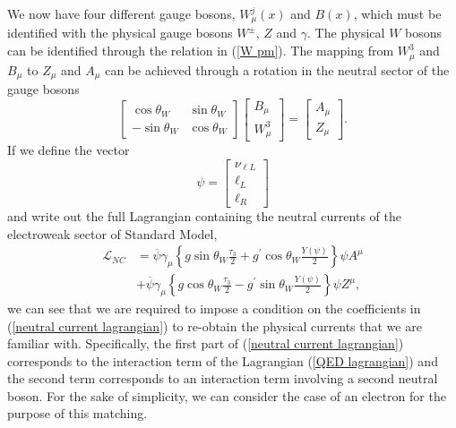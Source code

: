 \documentclass[10pt,a4paper]{book}
\begin{document}
We now have four different gauge bosons, $W^j_\mu(x)$ and $B(x)$, which must be identified with the physical gauge bosons $W^\pm$, $Z$ and $\gamma$. The physical $W$ bosons can be identified through the relation in (\ref{W pm}). The mapping from $W^3_\mu$ and $B_\mu$ to $Z_\mu$ and $A_\mu$ can be achieved through a rotation in the neutral sector of the gauge bosons
\begin{equation}
\label{mapping}
\begin{bmatrix}
\cos\theta_W & \sin\theta_W \\
-\sin\theta_W & \cos\theta_W
\end{bmatrix}
\begin{bmatrix}
B_\mu \\
W^3_\mu
\end{bmatrix} =
\begin{bmatrix}
A_\mu \\
Z_\mu
\end{bmatrix}.
\end{equation}
If we define the vector
\begin{equation}
\psi = \begin{bmatrix}
\nu_{\ell L} \\
\ell_L\\
\ell_R
\end{bmatrix}
\end{equation} 
and write out the full Lagrangian containing the neutral currents of the electroweak sector of Standard Model,
\begin{equation}
\label{neutral current lagrangian}
\begin{aligned}
\mathcal{L}_{NC} &= \overline{\psi}\gamma_\mu\left\lbrace g \sin\theta_W \frac{\tau_3}{2} + g^\prime \cos\theta_W \frac{Y(\psi)}{2} \right\rbrace \psi A^\mu \\
&+\overline{\psi}\gamma_\mu \left\lbrace g\cos\theta_W \frac{\tau_3}{2}- g^\prime\sin\theta_W\frac{Y(\psi)}{2}\right\rbrace\psi Z^\mu,
\end{aligned}
\end{equation}
we can see that we are required to impose a condition on the coefficients in (\ref{neutral current lagrangian}) to re-obtain the physical currents that we are familiar with. Specifically, the first part of (\ref{neutral current lagrangian}) corresponds to the interaction term of the Lagrangian (\ref{QED lagrangian}) and the second term corresponds to an interaction term involving a second neutral boson. For the sake of simplicity, we can consider the case of an electron for the purpose of this matching.
\end{document}
